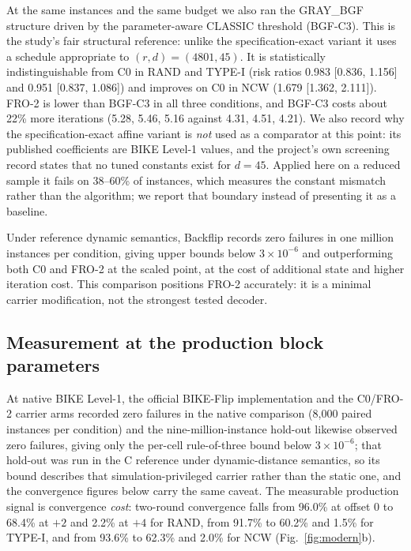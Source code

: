 \documentclass[lettersize,journal]{IEEEtran}
\begin{document}
At the same instances and the same budget we also ran the GRAY\_BGF structure driven by the parameter-aware CLASSIC threshold (BGF-C3). This is the study's fair structural reference: unlike the specification-exact variant it uses a schedule appropriate to $(r,d)=(4801,45)$. It is statistically indistinguishable from C0 in RAND and TYPE-I (risk ratios 0.983 [0.836, 1.156] and 0.951 [0.837, 1.086]) and improves on C0 in NCW (1.679 [1.362, 2.111]). FRO-2 is lower than BGF-C3 in all three conditions, and BGF-C3 costs about 22\% more iterations (5.28, 5.46, 5.16 against 4.31, 4.51, 4.21). We also record why the specification-exact affine variant is \emph{not} used as a comparator at this point: its published coefficients are BIKE Level-1 values, and the project's own screening record states that no tuned constants exist for $d=45$. Applied here on a reduced sample it fails on 38--60\% of instances, which measures the constant mismatch rather than the algorithm; we report that boundary instead of presenting it as a baseline.

Under reference dynamic semantics, Backflip records zero failures in one million instances per condition, giving upper bounds below $3\times10^{-6}$ and outperforming both C0 and FRO-2 at the scaled point, at the cost of additional state and higher iteration cost. This comparison positions FRO-2 accurately: it is a minimal carrier modification, not the strongest tested decoder.

\subsection{Measurement at the production block parameters}\label{sec:production}

At native BIKE Level-1, the official BIKE-Flip implementation and the C0/FRO-2 carrier arms recorded zero failures in the native comparison (8{,}000 paired instances per condition) and the nine-million-instance hold-out likewise observed zero failures, giving only the per-cell rule-of-three bound below $3\times10^{-6}$; that hold-out was run in the C reference under dynamic-distance semantics, so its bound describes that simulation-privileged carrier rather than the static one, and the convergence figures below carry the same caveat. The measurable production signal is convergence \emph{cost}: two-round convergence falls from 96.0\% at offset $0$ to 68.4\% at $+2$ and 2.2\% at $+4$ for RAND, from 91.7\% to 60.2\% and 1.5\% for TYPE-I, and from 93.6\% to 62.3\% and 2.0\% for NCW (Fig.~\ref{fig:modern}b).
\end{document}
